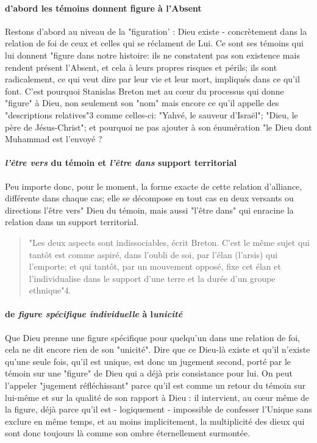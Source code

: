 \paragraph{d'abord les témoins donnent figure à l'Absent}
Restons d'abord au niveau de la "figuration' : Dieu existe - concrètement
 dans la relation de foi de ceux et celles qui se réclament de Lui. Ce sont ses témoins qui lui donnent "figure dans notre histoire: ils ne constatent pas son existence mais rendent présent l'Absent, et cela à leurs propres risques et périls; ils sont radicalement, ce qui veut dire par leur vie et leur mort, impliqués dans ce qu'il font. C'est pourquoi Stanislas Breton met au cœur du processus qui donne "figure" à Dieu, non seulement son "nom" mais encore ce qu'il appelle des "descriptions relatives"3 comme celles-ci: "Yahvé, le sauveur d'Israël"; "Dieu, le père de Jésus-Christ"; et pourquoi ne pas ajouter à son énumération "le Dieu dont Muhammad est l'envoyé ? 
 
 \paragraph{\textit{l'être vers} du témoin et \textit{l'être dans} support territorial}Peu importe donc, pour le moment, la forme exacte de cette relation d'alliance, différente dans chaque cas; elle se décompose en tout cas en deux versants ou directions l'être vers" Dieu du témoin, mais aussi "l'être dans" qui enracine la relation dans un support territorial.

 
\begin{quote}
    "Les deux aspects sont indissociables, écrit Breton. C'est le même sujet qui tantôt est comme aspiré, dans l'oubli de soi, par l'élan (l'arsis) qui l'emporte; et qui tantôt, par un mouvement opposé, fixe cet élan et l'individualise dans le support d'une terre et la durée d'un groupe ethnique"4.
\end{quote}

\paragraph{de \textit{figure spécifique individuelle} à l\textit{unicité}}
Que Dieu prenne une figure spécifique pour quelqu'un dans une relation de foi, cela ne dit encore rien de son "unicité". Dire que ce Dieu-là existe et qu'il n'existe qu'une seule fois, qu'il est unique, est donc un jugement second, porté par le témoin sur une "figure" de Dieu qui a déjà pris consistance pour lui. On peut l'appeler "jugement réfléchissant" parce qu'il est comme un retour du témoin sur lui-même et sur la qualité de son rapport à Dieu : il intervient, au cœur même de la figure, déjà parce qu'il est - logiquement - impossible de confesser l'Unique sans exclure en même temps, et au moins implicitement, la multiplicité des dieux qui sont donc toujours là comme son ombre éternellement surmontée.

